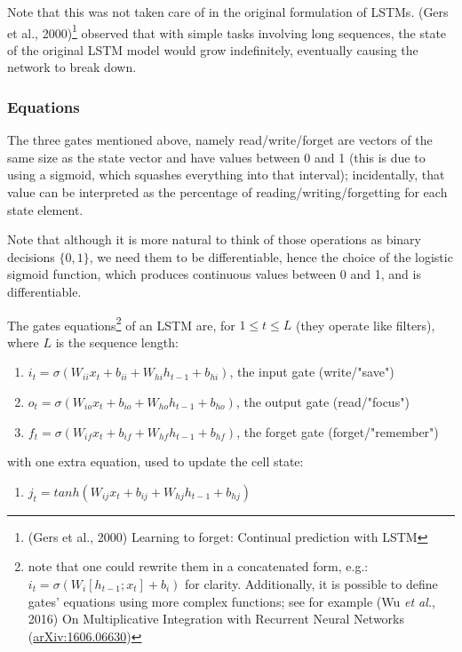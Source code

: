 \documentclass{article}
\begin{document}
Note that this was not taken care of in the original formulation of LSTMs. (Gers et al., 2000)\footnote{(Gers et al., 2000) Learning to forget: Continual prediction with LSTM} observed that with simple tasks involving long sequences, the state of the original LSTM model would grow indefinitely, eventually causing the network to break down.


\subsubsection{Equations}
\label{eqLSTM}
The three gates mentioned above, namely read/write/forget are vectors of the same size as the state vector and have values between 0 and 1 (this is due to using a sigmoid, which squashes everything into that interval); incidentally, that value can be interpreted as the percentage of reading/writing/forgetting for each state element.

Note that although it is more natural to think of those operations as binary decisions $\{0,1\}$, we need them to be differentiable, hence the choice of the logistic sigmoid function, which produces continuous values between 0 and 1, and is differentiable.

The gates equations\footnote{note that one could rewrite them in a concatenated form, e.g.: $i_t=\sigma(W_i [h_{t-1};x_t ] + b_i)$ for clarity. Additionally, it is possible to define gates' equations using more complex functions; see for example (Wu \textit{et al.}, 2016) On Multiplicative Integration with Recurrent Neural Networks (\href{https://arxiv.org/abs/1606.06630}{arXiv:1606.06630})} of an LSTM are, for $1\leq t \leq L$ (they operate like filters), where $L$ is the sequence length:

\begin{enumerate}[nosep]
  \item $i_t=\sigma(W_{ii}x_t + b_{ii} + W_{hi}h_{t-1} + b_{hi})$, the input gate (write/"save")
  \item $o_t=\sigma(W_{io}x_t + b_{io} + W_{ho}h_{t-1}  + b_{ho})$, the output gate (read/"focus")
  \item $f_t=\sigma(W_{if}x_t + b_{if} + W_{hf}h_{t-1}  + b_{hf})$, the forget gate (forget/"remember")
\end{enumerate}
\medskip

with one extra equation, used to update the cell state:
\begin{enumerate}
  \item $j_t = tanh(W_{ij}x_t + b_{ij} + W_{hj}h_{t-1} + b_{hj})$
\end{enumerate}
\medskip
\end{document}
